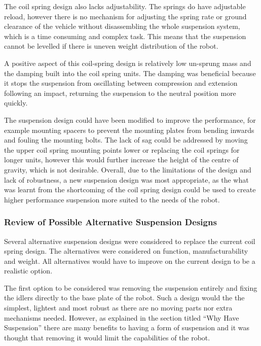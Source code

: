 The coil spring design also lacks adjustability. The springs do have adjustable reload, however there is no mechanism for adjusting the spring rate or ground clearance of the vehicle without disassembling the whole suspension system, which is a time consuming and complex task. This means that the suspension cannot be levelled if there is uneven weight distribution of the robot.


A positive aspect of this coil-spring design is relatively low un-sprung mass and the damping built into the coil spring units. The damping was beneficial because it stops the suspension from oscillating between compression and extension following an impact, returning the suspension to the neutral position more quickly.

The suspension design could have been modified to improve the performance, for example mounting spacers to prevent the mounting plates from bending inwards and fouling the mounting bolts. The lack of sag could be addressed by moving the upper coil spring mounting points lower or replacing the coil springs for longer units, however this would further increase the height of the centre of gravity, which is not desirable. Overall, due to the limitations of the design and lack of robustness, a new suspension design was most appropriate, as the what was learnt from the shortcoming of the coil spring design could be used to create higher performance suspension more suited to the needs of the robot.

\subsubsection{Review of Possible Alternative Suspension Designs}
Several alternative suspension designs were considered to replace the current coil spring design. The alternatives were considered on function, manufacturability and weight. All alternatives would have to improve on the current design to be a realistic option.\par

The first option to be considered was removing the suspension entirely and fixing the idlers directly to the base plate of the robot. Such a design would the the simplest, lightest and most robust as there are no moving parts nor extra mechanisms needed. However, as explained in the section titled “Why Have Suspension” there are many benefits to having a form of suspension and it was thought that removing it would limit the capabilities of the robot. \par

